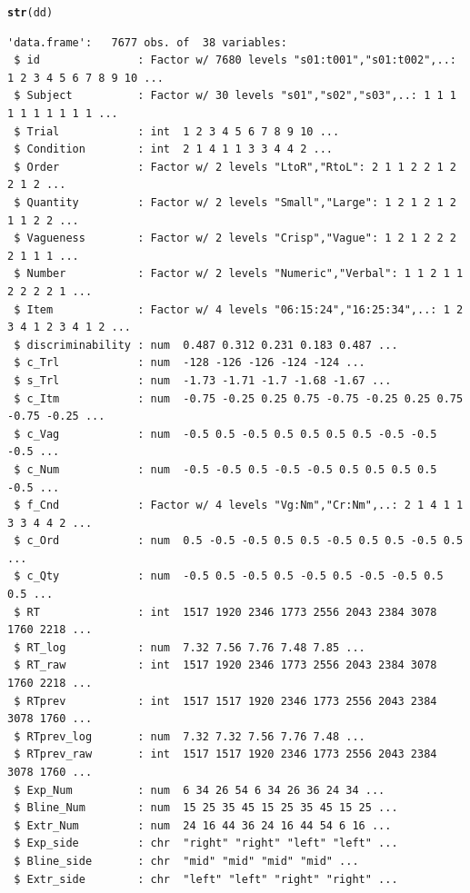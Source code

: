 \documentclass[a4paper,12pt,twoside]{article}\usepackage[]{graphicx}\usepackage[]{color}
\makeatletter
\newcommand{\hlstd}[1]{\textcolor[rgb]{0.345,0.345,0.345}{#1}}%
\newcommand{\hlkwd}[1]{\textcolor[rgb]{0.737,0.353,0.396}{\textbf{#1}}}%
\newenvironment{kframe}{%
 \def\at@end@of@kframe{}%
 \ifinner\ifhmode%
  \def\at@end@of@kframe{\end{minipage}}%
  \begin{minipage}{\columnwidth}%
 \fi\fi%
 \def\FrameCommand##1{\hskip\@totalleftmargin \hskip-\fboxsep
 \colorbox{shadecolor}{##1}\hskip-\fboxsep
     \hskip-\linewidth \hskip-\@totalleftmargin \hskip\columnwidth}%
 \MakeFramed {\advance\hsize-\width
   \@totalleftmargin\z@ \linewidth\hsize
   \@setminipage}}%
 {\par\unskip\endMakeFramed%
 \at@end@of@kframe}
\newenvironment{knitrout}{}{} %
\makeatother
\begin{document}
\clearpage

\begin{knitrout}\scriptsize
{}\color{fgcolor}\begin{kframe}
\begin{alltt}
\hlkwd{str}\hlstd{(dd)}
\end{alltt}
\begin{verbatim}
'data.frame':	7677 obs. of  38 variables:
 $ id               : Factor w/ 7680 levels "s01:t001","s01:t002",..: 1 2 3 4 5 6 7 8 9 10 ...
 $ Subject          : Factor w/ 30 levels "s01","s02","s03",..: 1 1 1 1 1 1 1 1 1 1 ...
 $ Trial            : int  1 2 3 4 5 6 7 8 9 10 ...
 $ Condition        : int  2 1 4 1 1 3 3 4 4 2 ...
 $ Order            : Factor w/ 2 levels "LtoR","RtoL": 2 1 1 2 2 1 2 2 1 2 ...
 $ Quantity         : Factor w/ 2 levels "Small","Large": 1 2 1 2 1 2 1 1 2 2 ...
 $ Vagueness        : Factor w/ 2 levels "Crisp","Vague": 1 2 1 2 2 2 2 1 1 1 ...
 $ Number           : Factor w/ 2 levels "Numeric","Verbal": 1 1 2 1 1 2 2 2 2 1 ...
 $ Item             : Factor w/ 4 levels "06:15:24","16:25:34",..: 1 2 3 4 1 2 3 4 1 2 ...
 $ discriminability : num  0.487 0.312 0.231 0.183 0.487 ...
 $ c_Trl            : num  -128 -126 -126 -124 -124 ...
 $ s_Trl            : num  -1.73 -1.71 -1.7 -1.68 -1.67 ...
 $ c_Itm            : num  -0.75 -0.25 0.25 0.75 -0.75 -0.25 0.25 0.75 -0.75 -0.25 ...
 $ c_Vag            : num  -0.5 0.5 -0.5 0.5 0.5 0.5 0.5 -0.5 -0.5 -0.5 ...
 $ c_Num            : num  -0.5 -0.5 0.5 -0.5 -0.5 0.5 0.5 0.5 0.5 -0.5 ...
 $ f_Cnd            : Factor w/ 4 levels "Vg:Nm","Cr:Nm",..: 2 1 4 1 1 3 3 4 4 2 ...
 $ c_Ord            : num  0.5 -0.5 -0.5 0.5 0.5 -0.5 0.5 0.5 -0.5 0.5 ...
 $ c_Qty            : num  -0.5 0.5 -0.5 0.5 -0.5 0.5 -0.5 -0.5 0.5 0.5 ...
 $ RT               : int  1517 1920 2346 1773 2556 2043 2384 3078 1760 2218 ...
 $ RT_log           : num  7.32 7.56 7.76 7.48 7.85 ...
 $ RT_raw           : int  1517 1920 2346 1773 2556 2043 2384 3078 1760 2218 ...
 $ RTprev           : int  1517 1517 1920 2346 1773 2556 2043 2384 3078 1760 ...
 $ RTprev_log       : num  7.32 7.32 7.56 7.76 7.48 ...
 $ RTprev_raw       : int  1517 1517 1920 2346 1773 2556 2043 2384 3078 1760 ...
 $ Exp_Num          : num  6 34 26 54 6 34 26 36 24 34 ...
 $ Bline_Num        : num  15 25 35 45 15 25 35 45 15 25 ...
 $ Extr_Num         : num  24 16 44 36 24 16 44 54 6 16 ...
 $ Exp_side         : chr  "right" "right" "left" "left" ...
 $ Bline_side       : chr  "mid" "mid" "mid" "mid" ...
 $ Extr_side        : chr  "left" "left" "right" "right" ...

\end{verbatim}
\end{kframe}
\end{knitrout}
\end{document}

